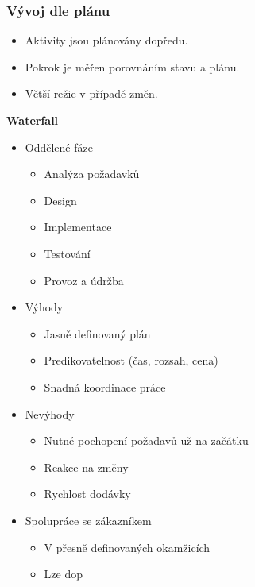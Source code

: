     \subsubsection{Vývoj dle plánu}
      \begin{itemize}
        \item Aktivity jsou plánovány dopředu.
        \item Pokrok je měřen porovnáním stavu a plánu.
        \item Větší režie v případě změn.
      \end{itemize}

      \textbf{Waterfall}

        \begin{itemize}
          \item Oddělené fáze
            \begin{itemize}
              \item Analýza požadavků
              \item Design
              \item Implementace
              \item Testování
              \item Provoz a údržba
            \end{itemize}
          \item Výhody
            \begin{itemize}
              \item Jasně definovaný plán
              \item Predikovatelnost (čas, rozsah, cena)
              \item Snadná koordinace práce
            \end{itemize}
          \item Nevýhody
            \begin{itemize}
              \item Nutné pochopení požadavů už na začátku
              \item Reakce na změny
              \item Rychlost dodávky
            \end{itemize}
          \item Spolupráce se zákazníkem
            \begin{itemize}
              \item V přesně definovaných okamžicích
              \item Lze dop
            \end{itemize}
        \end{itemize}

